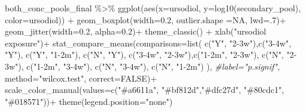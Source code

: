 \documentclass[
]{book}
\newenvironment{Shaded}{\begin{snugshade}}{\end{snugshade}}
\newcommand{\AttributeTok}[1]{\textcolor[rgb]{0.77,0.63,0.00}{#1}}
\newcommand{\CommentTok}[1]{\textcolor[rgb]{0.56,0.35,0.01}{\textit{#1}}}
\newcommand{\ConstantTok}[1]{\textcolor[rgb]{0.00,0.00,0.00}{#1}}
\newcommand{\DecValTok}[1]{\textcolor[rgb]{0.00,0.00,0.81}{#1}}
\newcommand{\FloatTok}[1]{\textcolor[rgb]{0.00,0.00,0.81}{#1}}
\newcommand{\FunctionTok}[1]{\textcolor[rgb]{0.00,0.00,0.00}{#1}}
\newcommand{\NormalTok}[1]{#1}
\newcommand{\SpecialCharTok}[1]{\textcolor[rgb]{0.00,0.00,0.00}{#1}}
\newcommand{\StringTok}[1]{\textcolor[rgb]{0.31,0.60,0.02}{#1}}
\begin{document}
\begin{Shaded}
\begin{Highlighting}[]
\NormalTok{both\_conc\_pools\_final }\SpecialCharTok{\%\textgreater{}\%} 
  \FunctionTok{ggplot}\NormalTok{(}\FunctionTok{aes}\NormalTok{(}\AttributeTok{x=}\NormalTok{ursodiol, }\AttributeTok{y=}\FunctionTok{log10}\NormalTok{(secondary\_pool), }\AttributeTok{color=}\NormalTok{ursodiol)) }\SpecialCharTok{+}
  \FunctionTok{geom\_boxplot}\NormalTok{(}\AttributeTok{width=}\FloatTok{0.2}\NormalTok{, }\AttributeTok{outlier.shape =}\ConstantTok{NA}\NormalTok{, }\AttributeTok{lwd=}\NormalTok{.}\DecValTok{7}\NormalTok{)}\SpecialCharTok{+}
  \FunctionTok{geom\_jitter}\NormalTok{(}\AttributeTok{width=}\FloatTok{0.2}\NormalTok{, }\AttributeTok{alpha=}\FloatTok{0.2}\NormalTok{)}\SpecialCharTok{+}
  \FunctionTok{theme\_classic}\NormalTok{() }\SpecialCharTok{+}
  \FunctionTok{xlab}\NormalTok{(}\StringTok{"ursodiol exposure"}\NormalTok{)}\SpecialCharTok{+}
  \FunctionTok{stat\_compare\_means}\NormalTok{(}\AttributeTok{comparisons=}\FunctionTok{list}\NormalTok{( }\FunctionTok{c}\NormalTok{(}\StringTok{"Y"}\NormalTok{, }\StringTok{"2{-}3w"}\NormalTok{),}\FunctionTok{c}\NormalTok{(}\StringTok{"3{-}4w"}\NormalTok{, }\StringTok{"Y"}\NormalTok{), }\FunctionTok{c}\NormalTok{(}\StringTok{"Y"}\NormalTok{, }\StringTok{"1{-}2m"}\NormalTok{), }\FunctionTok{c}\NormalTok{(}\StringTok{"N"}\NormalTok{, }\StringTok{"Y"}\NormalTok{),}
                                       \FunctionTok{c}\NormalTok{(}\StringTok{"3{-}4w"}\NormalTok{, }\StringTok{"2{-}3w"}\NormalTok{),}\FunctionTok{c}\NormalTok{(}\StringTok{"1{-}2m"}\NormalTok{, }\StringTok{"2{-}3w"}\NormalTok{), }\FunctionTok{c}\NormalTok{(}\StringTok{"N"}\NormalTok{, }\StringTok{"2{-}3w"}\NormalTok{),}
                                       \FunctionTok{c}\NormalTok{(}\StringTok{"1{-}2m"}\NormalTok{, }\StringTok{"3{-}4w"}\NormalTok{),  }\FunctionTok{c}\NormalTok{(}\StringTok{"N"}\NormalTok{, }\StringTok{"3{-}4w"}\NormalTok{),}
                                       \FunctionTok{c}\NormalTok{(}\StringTok{"N"}\NormalTok{, }\StringTok{"1{-}2m"}\NormalTok{)}
\NormalTok{  ),}
  \CommentTok{\#label="p.signif",}
  \AttributeTok{method=}\StringTok{"wilcox.test"}\NormalTok{,}
  \AttributeTok{correct=}\ConstantTok{FALSE}\NormalTok{)}\SpecialCharTok{+}
  \FunctionTok{scale\_color\_manual}\NormalTok{(}\AttributeTok{values=}\FunctionTok{c}\NormalTok{(}\StringTok{"\#a6611a"}\NormalTok{, }\StringTok{"\#bf812d"}\NormalTok{,}\StringTok{"\#dfc27d"}\NormalTok{, }\StringTok{"\#80cdc1"}\NormalTok{, }\StringTok{"\#018571"}\NormalTok{))}\SpecialCharTok{+}
  \FunctionTok{theme}\NormalTok{(}\AttributeTok{legend.position=}\StringTok{"none"}\NormalTok{)}
\end{Highlighting}
\end{Shaded}
\end{document}
